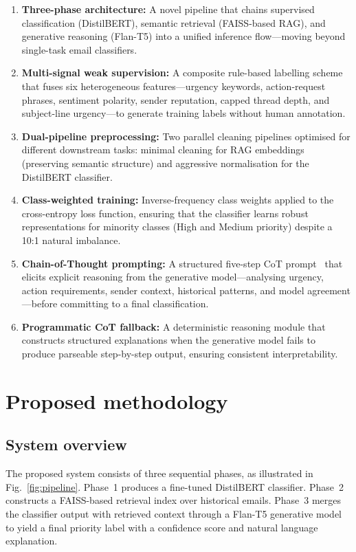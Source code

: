 \documentclass[3p,times,procedia]{elsarticle}
\begin{document}
\begin{enumerate}
\item \textbf{Three-phase architecture:} A novel pipeline that chains supervised classification (DistilBERT), semantic retrieval (FAISS-based RAG), and generative reasoning (Flan-T5) into a unified inference flow---moving beyond single-task email classifiers.
\item \textbf{Multi-signal weak supervision:} A composite rule-based labelling scheme that fuses six heterogeneous features---urgency keywords, action-request phrases, sentiment polarity, sender reputation, capped thread depth, and subject-line urgency---to generate training labels without human annotation.
\item \textbf{Dual-pipeline preprocessing:} Two parallel cleaning pipelines optimised for different downstream tasks: minimal cleaning for RAG embeddings (preserving semantic structure) and aggressive normalisation for the DistilBERT classifier.
\item \textbf{Class-weighted training:} Inverse-frequency class weights applied to the cross-entropy loss function, ensuring that the classifier learns robust representations for minority classes (High and Medium priority) despite a 10:1 natural imbalance.
\item \textbf{Chain-of-Thought prompting:} A structured five-step CoT prompt~\cite{wei2022} that elicits explicit reasoning from the generative model---analysing urgency, action requirements, sender context, historical patterns, and model agreement---before committing to a final classification.
\item \textbf{Programmatic CoT fallback:} A deterministic reasoning module that constructs structured explanations when the generative model fails to produce parseable step-by-step output, ensuring consistent interpretability.
\end{enumerate}


\section{Proposed methodology}
\label{sec:method}

\subsection{System overview}

The proposed system consists of three sequential phases, as illustrated in Fig.~\ref{fig:pipeline}. Phase~1 produces a fine-tuned DistilBERT classifier. Phase~2 constructs a FAISS-based retrieval index over historical emails. Phase~3 merges the classifier output with retrieved context through a Flan-T5 generative model to yield a final priority label with a confidence score and natural language explanation.
\end{document}
